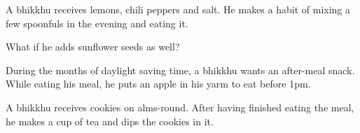 \bigskip

A bhikkhu receives lemons, chili peppers and salt. He makes a habit of mixing a
few spoonfuls in the evening and eating it.

\bigskip

What if he adds sunflower seeds as well?

\bigskip

During the months of daylight saving time, a bhikkhu wants an after-meal snack.
While eating his meal, he puts an apple in his yarm to eat before 1pm.

\bigskip

A bhikkhu receives cookies on alms-round. After having finished eating the meal, he makes a cup of tea and
dips the cookies in it.


